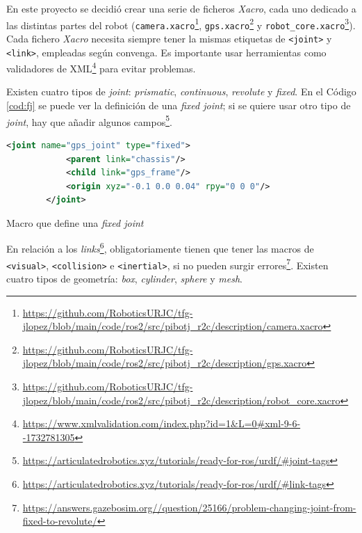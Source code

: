 En este proyecto se decidió crear una serie de ficheros \textit{Xacro}, cada uno dedicado a las distintas partes del robot (\verb|camera.xacro|\footnote{\url{https://github.com/RoboticsURJC/tfg-jlopez/blob/main/code/ros2/src/pibotj_r2c/description/camera.xacro}}, \verb|gps.xacro|\footnote{\url{https://github.com/RoboticsURJC/tfg-jlopez/blob/main/code/ros2/src/pibotj_r2c/description/gps.xacro}} y \verb|robot_core.xacro|\footnote{\url{https://github.com/RoboticsURJC/tfg-jlopez/blob/main/code/ros2/src/pibotj_r2c/description/robot_core.xacro}}). Cada fichero \textit{Xacro} necesita siempre tener la mismas etiquetas de \verb|<joint>| y \verb|<link>|, empleadas según convenga. Es importante usar herramientas como validadores de XML\footnote{\url{https://www.xmlvalidation.com/index.php?id=1&L=0\#xml-9-6--1732781305}} para evitar problemas.

Existen cuatro tipos de \textit{joint}: \textit{prismatic}, \textit{continuous}, \textit{revolute} y \textit{fixed}. En el Código \ref{cod:fj} se puede ver la definición de una \textit{fixed joint}; si se quiere usar otro tipo de \textit{joint}, hay que añadir algunos campos\footnote{\url{https://articulatedrobotics.xyz/tutorials/ready-for-ros/urdf/\#joint-tags}}.

\begin{code}[h]
	\begin{lstlisting}[language=xml]
		<joint name="gps_joint" type="fixed">
			<parent link="chassis"/>
			<child link="gps_frame"/>
			<origin xyz="-0.1 0.0 0.04" rpy="0 0 0"/>
		</joint>
	\end{lstlisting}
	\caption[Macro que define \textit{fixed joint}]{Macro que define una \textit{fixed joint}}
	\label{cod:fj}
			\end{code}

En relación a los \textit{links}\footnote{\url{https://articulatedrobotics.xyz/tutorials/ready-for-ros/urdf/\#link-tags}}, obligatoriamente tienen que tener las macros de \verb|<visual>|, \verb|<collision>| e \verb|<inertial>|, si no pueden surgir errores\footnote{\url{https://answers.gazebosim.org//question/25166/problem-changing-joint-from-fixed-to-revolute/}}. Existen cuatro tipos de geometría: \textit{box}, \textit{cylinder}, \textit{sphere} y \textit{mesh}. 

